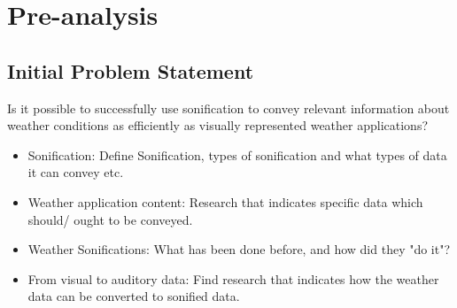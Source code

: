 \section{Pre-analysis} \label{sec:preanalysus}

\subsection{Initial Problem Statement} \label{sec:ips}
Is it possible to successfully use sonification to convey relevant information about weather conditions as efficiently as visually represented weather applications?

\begin{itemize}
\item Sonification: 
Define Sonification, types of sonification and what types of data it can convey etc.
\item Weather application content:
Research that indicates specific data which should/ ought to be conveyed.
\item Weather Sonifications:
What has been done before, and how did they "do it"?
\item From visual to auditory data:
Find research that indicates how the weather data can be converted to sonified data.
\end{itemize}